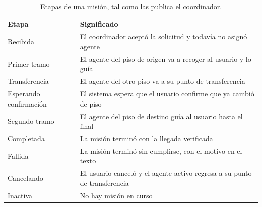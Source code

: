 \begin{table}[H]
  \centering\small
  \caption{Etapas de una misión, tal como las publica el coordinador.}
  \label{tab:etapas-mision}
  \begin{tabular}{@{}p{}p{}@{}}
    \toprule
    \textbf{Etapa} & \textbf{Significado} \\ \midrule
    Recibida & El coordinador aceptó la solicitud y todavía no asignó agente \\
    Primer tramo & El agente del piso de origen va a recoger al usuario y lo guía \\
    Transferencia & El agente del otro piso va a su punto de transferencia \\
    Esperando confirmación & El sistema espera que el usuario confirme que ya cambió de piso \\
    Segundo tramo & El agente del piso de destino guía al usuario hasta el final \\
    Completada & La misión terminó con la llegada verificada \\
    Fallida & La misión terminó sin cumplirse, con el motivo en el texto \\
    Cancelando & El usuario canceló y el agente activo regresa a su punto de transferencia \\
    Inactiva & No hay misión en curso \\ \bottomrule
  \end{tabular}
\end{table}

